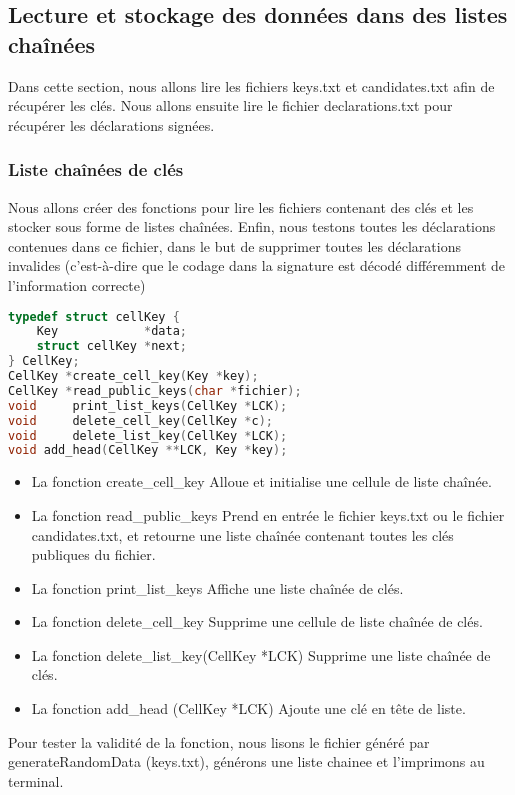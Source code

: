 \documentclass{article}
\begin{document}
\subsection{Lecture et stockage des données dans des listes chaînées}
Dans cette section, nous allons lire les fichiers keys.txt et candidates.txt afin de récupérer les clés. Nous allons ensuite lire le fichier declarations.txt pour récupérer les déclarations signées.\newline
\subsubsection{Liste chaînées de clés}
Nous allons créer des fonctions pour lire les fichiers contenant des clés et les stocker sous forme de listes chaînées.\newline
Enfin, nous testons toutes les déclarations contenues dans ce fichier, dans le but de supprimer toutes les déclarations invalides (c'est-à-dire que le codage dans la signature est décodé différemment de l'information correcte)\newline
\begin{lstlisting}[language={C}]
typedef struct cellKey {
    Key            *data;
    struct cellKey *next;
} CellKey;
CellKey *create_cell_key(Key *key);
CellKey *read_public_keys(char *fichier);
void     print_list_keys(CellKey *LCK);
void     delete_cell_key(CellKey *c);
void     delete_list_key(CellKey *LCK);
void add_head(CellKey **LCK, Key *key);
\end{lstlisting}
\begin{itemize}
    \item La fonction create\_cell\_key Alloue et initialise une cellule de liste chaînée.
    \item La fonction read\_public\_keys Prend en entrée le fichier keys.txt ou le fichier candidates.txt, et retourne une liste chaînée contenant toutes les clés publiques du fichier.
    \item La fonction print\_list\_keys Affiche une liste chaînée de clés.
    \item La fonction delete\_cell\_key Supprime une cellule de liste chaînée de clés.
    \item La fonction delete\_list\_key(CellKey *LCK) Supprime une liste chaînée de clés.
    \item La fonction add\_head (CellKey *LCK) Ajoute une clé en tête de liste.
\end{itemize}
Pour tester la validité de la fonction, nous lisons le fichier généré par generateRandomData (keys.txt), générons une liste chainee et l'imprimons au terminal.\newline
\end{document}
